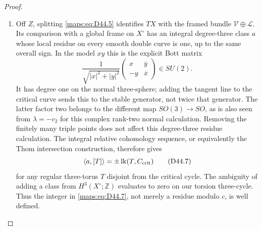 \begin{proof}
\begin{enumerate}[label=\arabic*.,leftmargin=*]
\item Off $Z$, splitting \eqref{maps:eq:D44.5} identifies $TX$ with the framed
bundle $\mathcal V\oplus\mathcal L$. Its comparison with a
global frame on $X^\circ$ has an integral degree-three class
$a$ whose local residue on every smooth double curve is one,
up to the same overall sign. In the model $xy$ this is the
explicit Bott matrix
\[
 \frac1{\sqrt{|x|^2+|y|^2}}
 \begin{pmatrix}x&\overline y\\-y&\overline x\end{pmatrix}
       \in SU(2).                                            \tag{D44.6}\label{maps:eq:D44.6}
\]
It has degree one on the normal three-sphere; adding the
tangent line to the critical curve sends this to the stable
generator, not twice that generator. The latter factor two
belongs to the different map $SO(3)\to SO$, as is also seen
from $\lambda=-c_2$ for this complex rank-two normal calculation.
Removing the finitely many triple points does not affect this
degree-three residue calculation. The integral relative
cohomology sequence, or equivalently the Thom intersection
construction, therefore gives
\[
 \langle a,[T]\rangle
      =\pm\operatorname{lk}(T,C_{\rm crit})                   \tag{D44.7}\label{maps:eq:D44.7}
\]
for any regular three-torus $T$ disjoint from the critical
cycle. The ambiguity of adding a class from $H^3(X^\circ;\mathbb Z)$
evaluates to zero on our torsion three-cycle. Thus the integer
in \eqref{maps:eq:D44.7}, not merely a residue modulo $c$, is well defined.


\end{enumerate}
\end{proof}

